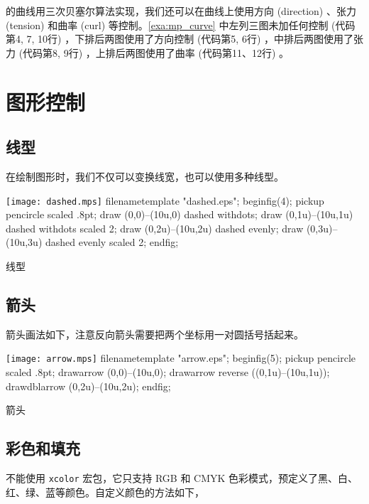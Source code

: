 \MP 的曲线用三次贝塞尔算法实现，我们还可以在曲线上使用方向 (direction) 、张力 (tension) 和曲率 (curl) 等控制。\autoref{exa:mp_curve} 中左列三图未加任何控制 (代码第4, 7, 10行) ，下排后两图使用了方向控制 (代码第5, 6行) ，中排后两图使用了张力 (代码第8, 9行) ，上排后两图使用了曲率 (代码第11、12行) 。

\section{图形控制}
\subsection{线型}

在绘制图形时，我们不仅可以变换线宽，也可以使用多种线型。

\begin{example}[htbp]
\begin{FBTDemo}[numbers=left]{\texttt{[image: dashed.mps]}}
filenametemplate "dashed.eps";
beginfig(4);
pickup pencircle scaled .8pt;
draw (0,0)--(10u,0) dashed withdots;
draw (0,1u)--(10u,1u) dashed withdots scaled 2;
draw (0,2u)--(10u,2u) dashed evenly;
draw (0,3u)--(10u,3u) dashed evenly scaled 2;
endfig;
\end{FBTDemo}
\caption{\MP 线型}
\label{exa:mp_dashed}
\end{example}

\subsection{箭头}

箭头画法如下，注意反向箭头需要把两个坐标用一对圆括号括起来。

\begin{example}[htbp]
\begin{FBTDemo}[numbers=left]{\texttt{[image: arrow.mps]}}
filenametemplate "arrow.eps";
beginfig(5);
pickup pencircle scaled .8pt;
drawarrow (0,0)--(10u,0);
drawarrow reverse ((0,1u)--(10u,1u));
drawdblarrow (0,2u)--(10u,2u);
endfig;
\end{FBTDemo}
\caption{\MP 箭头}
\label{exa:mp_arrow}
\end{example}

\subsection{彩色和填充}

\MP 不能使用 \texttt{xcolor} 宏包，它只支持 RGB 和 CMYK 色彩模式，预定义了黑、白、红、绿、蓝等颜色。自定义颜色的方法如下，

